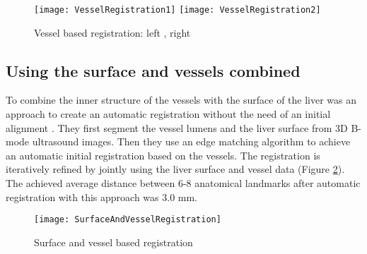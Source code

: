 \begin{figure}[H]
  \centering
 \texttt{[image: VesselRegistration1]}
  \endminipage
  \hfill
 \texttt{[image: VesselRegistration2]}
  \endminipage
  \hfill
 \caption{Vessel based registration: left \cite{ribes2012image}, right \cite{lange20093d}}
  \label{fig:VesselRegistration}
\end{figure}


\subsection{Using the surface and vessels combined}
To combine the inner structure of the vessels with the surface of the liver was
an approach to create an automatic registration without the need of an initial
alignment \cite{nam2011automatic}. They first segment the vessel lumens and the liver surface from 3D
B-mode ultrasound images. Then they use an edge matching algorithm to achieve an
automatic initial registration based on the vessels. The registration is
iteratively refined by jointly using the liver surface and vessel data (Figure
\ref{fig:SurfaceAndVesselRegistration}). The achieved average distance between
6-8 anatomical landmarks after automatic registration with this approach was 3.0 mm.

\begin{figure}[H]
  \centering
 \texttt{[image: SurfaceAndVesselRegistration]}
 \caption{Surface and vessel based registration \cite{nam2011automatic}}
  \label{fig:SurfaceAndVesselRegistration}
\end{figure}




